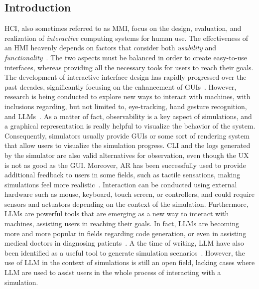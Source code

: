 \documentclass[conference]{IEEEtran}
\begin{document}
\subsection{Introduction}
\ac{HCI},
also sometimes referred to as \ac{MMI},
focus on the design, evaluation, and realization of \emph{interactive} computing systems for human use.
The effectiveness of an \ac{HMI} heavenly depends on factors that consider both \emph{usability} and \emph{functionality}~\cite{Sinha2010}.
%
The two aspects must be balanced in order to create easy-to-use interfaces,
whereas providing all the necessary tools for users to reach their goals.
%
The development of interactive interface design has rapidly progressed over the past decades,
significantly focusing on the enhancement of \acp{GUI}~\cite{Murad2019}.
%
However,
research is being conducted to explore new ways to interact with machines,
with inclusions regarding,
but not limited to,
eye-tracking,
hand gesture recognition,
and \acp{LLM}~\cite{Poole2006, Sarma2021, kapania2024imcategorizingllmproductivity}.
%
As a matter of fact,
observability is a key aspect of simulations,
and a graphical representation is really helpful to visualize the behavior of the system.
%
Consequently,
simulators usually provide \acp{GUI} or some sort of rendering system that allow users to visualize the simulation progress.
%
\ac{CLI} and the logs generated by the simulator are also valid alternatives for observation,
even though the \ac{UX} is not as good as the \ac{GUI}.
%
Moreover,
\ac{AR} has been successfully used to provide additional feedback to users in some fields,
such as tactile sensations,
making simulations feel more realistic~\cite{Jud2020}.
%
Interaction can be conducted using external hardware such as mouse, keyboard, touch screen, or controllers,
and could require sensors and actuators depending on the context of the simulation.
%
Furthermore,
\ac{LLM}s are powerful tools that are emerging as a new way to interact with machines,
assisting users in reaching their goals.
%
In fact,
\acp{LLM} are becoming more and more popular in fields regarding code generation,
or even in assisting medical doctors in diagnosing patients~\cite{Wu2024}.
%
A the time of writing,
\ac{LLM} have also been identified as a useful tool to generate simulation scenarios~\cite{Zhang2023}.
%
However,
the use of \ac{LLM} in the context of simulations is still an open field,
lacking cases where \ac{LLM} are used to assist users in the whole process of interacting with a simulation.
%
\end{document}
